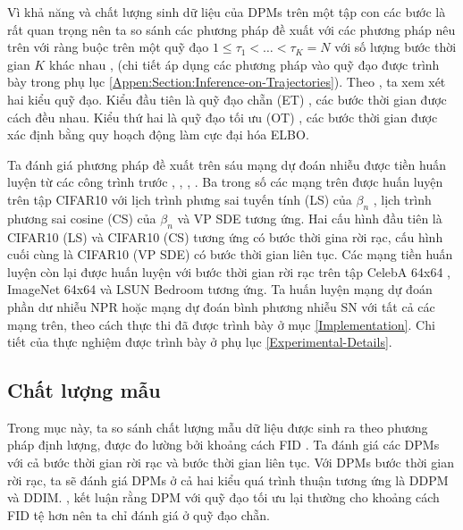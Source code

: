 \documentclass[14pt, a4paper]{article}
\numberwithin{equation}{section}
\numberwithin{figure}{section}
\numberwithin{dl}{section}
\numberwithin{md}{section}
\numberwithin{bd}{section}
\numberwithin{dn}{section}
\numberwithin{hq}{section}
\begin{document}
    Vì khả năng và chất lượng sinh dữ liệu của DPMs trên một tập con các bước là rất quan trọng nên ta so sánh các phương pháp đề xuất với các phương pháp nêu trên với ràng buộc trên một quỹ đạo
    $1 \leq \tau_1 < \dots < \tau_K = N$ với số lượng bước thời gian $K$ khác nhau \cite{song2020denoising}, \cite{bao2021analytic} (chi tiết áp dụng các phương pháp vào quỹ đạo được trình bày trong phụ lục \ref{Appen:Section:Inference-on-Trajectories}).
    Theo \cite{bao2021analytic}, ta xem xét hai kiểu quỹ đạo. Kiểu đầu tiên là quỹ đạo chẵn (ET) \cite{nichol2021improved}, các bước thời gian được cách đều nhau. Kiểu thứ hai là quỹ đạo tối ưu (OT) \cite{watson2021learning}, 
    các bước thời gian được xác định bằng quy hoạch động làm cực đại hóa ELBO.

    Ta đánh giá phương pháp đề xuất trên sáu mạng dự đoán nhiễu được tiền huấn luyện từ các công trình trước \cite{ho2020denoising}, \cite{song2020denoising}, \cite{nichol2021improved}, \cite{bao2021analytic}.
    Ba trong số các mạng trên được huấn luyện trên tập CIFAR10 \cite{krizhevsky2009learning} với lịch trình phưng sai tuyến tính (LS) của $\beta_n$ \cite{ho2020denoising},
    lịch trình phương sai cosine (CS) của $\beta_n$ \cite{nichol2021improved} và VP SDE \cite{song2020score} tương ứng.
    Hai cấu hình đầu tiên là CIFAR10 (LS) và CIFAR10 (CS) tương ứng có bước thời gina rời rạc, cấu hình cuối cùng là CIFAR10 (VP SDE) có bước thời gian liên tục.
    Các mạng tiền huấn luyện còn lại được huấn luyện với bước thời gian rời rạc trên tập CelebA 64x64 \cite{liu2015deep}, ImageNet 64x64 \cite{deng2009imagenet} và LSUN Bedroom \cite{yu2015lsun} tương ứng.
    Ta huấn luyện mạng dự đoán phần dư nhiễu NPR hoặc mạng dự đoán bình phương nhiễu SN với tất cả các mạng trên, theo cách thực thi đã được trình bày ở mục \ref{Implementation}.
    Chi tiết của thực nghiệm được trình bày ở phụ lục \ref{Experimental-Details}.

    \subsection{Chất lượng mẫu} \label{Subsection:Sample-Quality}

    Trong mục này, ta so sánh chất lượng mẫu dữ liệu được sinh ra theo phương pháp định lượng, được đo lường bởi khoảng cách FID \cite{heusel2017gans}.
    Ta đánh giá các DPMs với cả bước thời gian rời rạc và bước thời gian liên tục. Với DPMs bước thời gian rời rạc, ta sẽ đánh giá DPMs ở cả hai kiểu quá trình thuận tương ứng là DDPM và DDIM.
    \cite{watson2021learning}, \cite{bao2021analytic} kết luận rằng DPM với quỹ đạo tối ưu lại thường cho khoảng cách FID tệ hơn nên ta chỉ đánh giá ở quỹ đạo chẵn.
\end{document}
